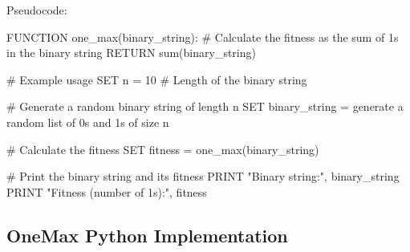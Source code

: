 \documentclass[
  letterpaper,
  DIV=11,
  numbers=noendperiod]{scrreprt}
\newenvironment{Shaded}{\begin{snugshade}}{\end{snugshade}}
\newcommand{\NormalTok}[1]{\textcolor[rgb]{0.00,0.23,0.31}{#1}}
\begin{document}
\begin{Shaded}
\begin{Highlighting}[]
\NormalTok{Pseudocode:}


\NormalTok{FUNCTION one\_max(binary\_string):}
\NormalTok{\# Calculate the fitness as the sum of 1s in the binary string}
\NormalTok{    RETURN sum(binary\_string)}

\NormalTok{\# Example usage}
\NormalTok{SET n = 10  \# Length of the binary string}

\NormalTok{\# Generate a random binary string of length n}
\NormalTok{SET binary\_string = generate a random list of 0s and 1s of size n}

\NormalTok{\# Calculate the fitness}
\NormalTok{SET fitness = one\_max(binary\_string)}

\NormalTok{\# Print the binary string and its fitness}
\NormalTok{PRINT "Binary string:", binary\_string}
\NormalTok{PRINT "Fitness (number of 1s):", fitness}
\end{Highlighting}
\end{Shaded}

\subsection{OneMax Python
Implementation}\label{onemax-python-implementation}
\end{document}
